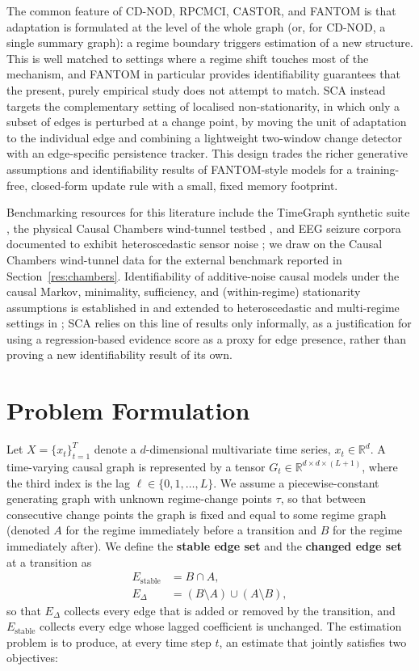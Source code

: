\documentclass{ieeeaccess}
\newcommand{\Estable}{E_{\mathrm{stable}}}
\newcommand{\Edelta}{E_{\Delta}}
\begin{document}
The common feature of CD-NOD, RPCMCI, CASTOR, and FANTOM is that adaptation is formulated at the level of the whole graph (or, for CD-NOD, a single summary graph): a regime boundary triggers estimation of a new structure. This is well matched to settings where a regime shift touches most of the mechanism, and FANTOM in particular provides identifiability guarantees that the present, purely empirical study does not attempt to match. SCA instead targets the complementary setting of localised non-stationarity, in which only a subset of edges is perturbed at a change point, by moving the unit of adaptation to the individual edge and combining a lightweight two-window change detector with an edge-specific persistence tracker. This design trades the richer generative assumptions and identifiability results of FANTOM-style models for a training-free, closed-form update rule with a small, fixed memory footprint.

Benchmarking resources for this literature include the TimeGraph synthetic suite \cite{r11}, the physical Causal Chambers wind-tunnel testbed \cite{r12}, and EEG seizure corpora documented to exhibit heteroscedastic sensor noise \cite{r8,r13}; we draw on the Causal Chambers wind-tunnel data for the external benchmark reported in Section~\ref{res:chambers}. Identifiability of additive-noise causal models under the causal Markov, minimality, sufficiency, and (within-regime) stationarity assumptions is established in \cite{r14} and extended to heteroscedastic and multi-regime settings in \cite{r8}; SCA relies on this line of results only informally, as a justification for using a regression-based evidence score as a proxy for edge presence, rather than proving a new identifiability result of its own.

\section{Problem Formulation}
\label{sec:problem}
Let $X=\{x_t\}_{t=1}^{T}$ denote a $d$-dimensional multivariate time series, $x_t\in\mathbb{R}^{d}$. A time-varying causal graph is represented by a tensor $G_t\in\mathbb{R}^{d\times d\times(L+1)}$, where the third index is the lag $\ell\in\{0,1,\dots,L\}$. We assume a piecewise-constant generating graph with unknown regime-change points $\tau$, so that between consecutive change points the graph is fixed and equal to some regime graph (denoted $A$ for the regime immediately before a transition and $B$ for the regime immediately after). We define the \textbf{stable edge set} and the \textbf{changed edge set} at a transition as
\begin{align}
\Estable &= B\cap A, \label{eq:stable}\\
\Edelta &= (B\setminus A)\cup(A\setminus B), \label{eq:changed}
\end{align}
so that $\Edelta$ collects every edge that is added or removed by the transition, and $\Estable$ collects every edge whose lagged coefficient is unchanged. The estimation problem is to produce, at every time step $t$, an estimate that jointly satisfies two objectives:
\end{document}
